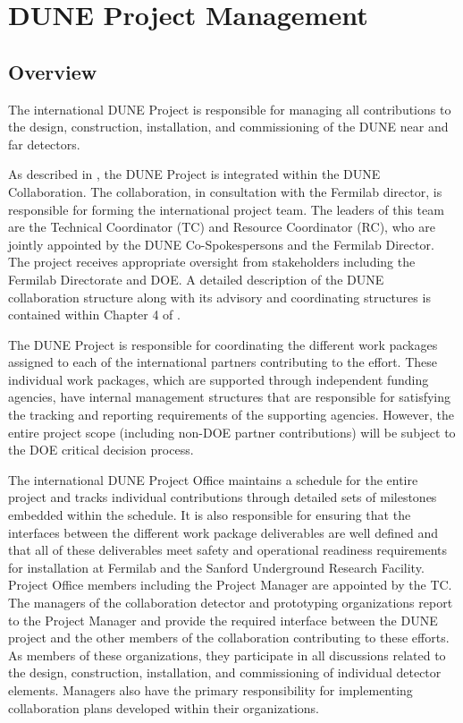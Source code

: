 \chapter{DUNE Project Management}
\label{ch:detectors-pm}

\section{Overview}

The international DUNE Project is responsible for managing all contributions to the design, construction, installation, and
commissioning of the DUNE near and far detectors.

As described in \volintro, the DUNE Project is integrated within the DUNE Collaboration.
The collaboration, in consultation with the Fermilab director, is responsible for forming the international project team.  The
leaders of this team are the Technical Coordinator (TC) and Resource Coordinator (RC), who are jointly appointed by
the DUNE Co-Spokespersons and the Fermilab Director.  The project receives appropriate oversight from stakeholders
including the Fermilab Directorate and DOE.  A detailed description of the DUNE collaboration structure along with its
advisory and coordinating structures is contained within Chapter 4 of \volintro.  

The DUNE Project is responsible for coordinating the different work packages assigned to each of the international
partners contributing to the effort.  These individual work packages, which are supported through independent funding
agencies, have internal management structures that are responsible for satisfying the tracking and reporting requirements
of the supporting agencies.  However, the entire project scope (including non-DOE partner contributions) will be subject to
the DOE critical decision process.

The international DUNE Project Office maintains a schedule for the entire project and tracks individual contributions
through detailed sets of milestones embedded within the schedule.  It is also responsible for ensuring that the interfaces
between the different work package deliverables are well defined and that all of these deliverables meet safety and
operational readiness requirements for installation at Fermilab and the Sanford Underground Research Facility.  
Project Office members including the Project Manager are appointed by the TC.  The managers of the collaboration
detector and prototyping organizations report to the Project Manager and provide the required interface between
the DUNE project and the other members of the collaboration contributing to these efforts.  As members of these
organizations, they participate in all discussions related to the design, construction, installation, and commissioning
of individual detector elements.  Managers also have the primary responsibility for implementing collaboration plans
developed within their organizations.

